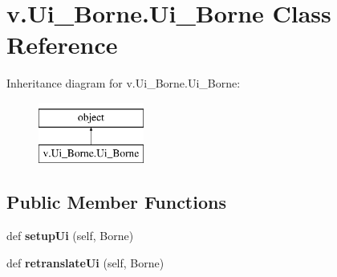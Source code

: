 \hypertarget{classv_1_1_ui___borne_1_1_ui___borne}{}\section{v.\+Ui\+\_\+\+Borne.\+Ui\+\_\+\+Borne Class Reference}
\label{classv_1_1_ui___borne_1_1_ui___borne}
Inheritance diagram for v.\+Ui\+\_\+\+Borne.\+Ui\+\_\+\+Borne\+:\begin{figure}[H]
\begin{center}
\leavevmode
\includegraphics[height=2.000000cm]{classv_1_1_ui___borne_1_1_ui___borne}
\end{center}
\end{figure}
\subsection*{Public Member Functions}
\begin{DoxyCompactItemize}
\item 
\hypertarget{classv_1_1_ui___borne_1_1_ui___borne_af12399d50736a1438831436a98730b22}{}def {\bfseries setup\+Ui} (self, Borne)\label{classv_1_1_ui___borne_1_1_ui___borne_af12399d50736a1438831436a98730b22}

\item 
\hypertarget{classv_1_1_ui___borne_1_1_ui___borne_acbb19a2bd5961c5c14e701a2a7f8bddd}{}def {\bfseries retranslate\+Ui} (self, Borne)\label{classv_1_1_ui___borne_1_1_ui___borne_acbb19a2bd5961c5c14e701a2a7f8bddd}

\end{DoxyCompactItemize}
